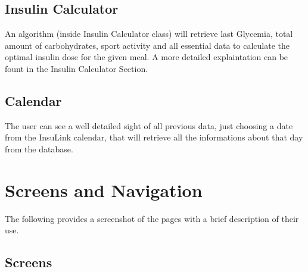 \documentclass[12pt,hidelinks]{article}
\begin{document}
	\subsection{Insulin Calculator}
    An algorithm (inside Insulin Calculator class) will retrieve last Glycemia, total amount of carbohydrates, sport activity and all essential data
	to calculate the optimal insulin dose for the given meal. A more detailed explaintation can be fount in the Insulin Calculator Section.

	\subsection{Calendar}
	The user can see a well detailed sight of all previous data, just choosing a date from the InsuLink calendar, that will retrieve all the informations
	about that day from the database.
	
\newpage
\section{Screens and Navigation}
\vspace{10.5cm}
The following provides a screenshot of the pages with a brief description of their use.
	\subsection{Screens}
\end{document}
